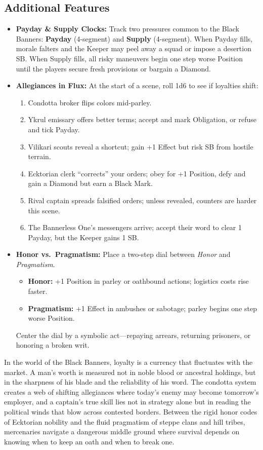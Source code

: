 \subsection*{Additional Features}
\begin{itemize}
\item \textbf{Payday \& Supply Clocks:} Track two pressures common to the Black Banners: \textbf{Payday} (4-segment) and \textbf{Supply} (4-segment). When Payday fills, morale falters and the Keeper may peel away a squad or impose a desertion SB. When Supply fills, all risky maneuvers begin one step worse Position until the players secure fresh provisions or bargain a Diamond.
\item \textbf{Allegiances in Flux:} At the start of a scene, roll 1d6 to see if loyalties shift:
\begin{enumerate}
  \item Condotta broker flips colors mid-parley.  
  \item Ykrul emissary offers better terms; accept and mark Obligation, or refuse and tick Payday.  
  \item Vilikari scouts reveal a shortcut; gain +1 Effect but risk SB from hostile terrain.  
  \item Ecktorian clerk ``corrects'' your orders; obey for +1 Position, defy and gain a Diamond but earn a Black Mark.  
  \item Rival captain spreads falsified orders; unless revealed, counters are harder this scene.  
  \item The Bannerless One's messengers arrive; accept their word to clear 1 Payday, but the Keeper gains 1 SB.  
\end{enumerate}
\item \textbf{Honor vs.\ Pragmatism:} Place a two-step dial between \emph{Honor} and \emph{Pragmatism}.  
\begin{itemize}
  \item \textbf{Honor:} +1 Position in parley or oathbound actions; logistics costs rise faster.  
  \item \textbf{Pragmatism:} +1 Effect in ambushes or sabotage; parley begins one step worse Position.  
\end{itemize}
Center the dial by a symbolic act---repaying arrears, returning prisoners, or honoring a broken writ.
\end{itemize}

\begin{tcolorbox}[colback=black!3,colframe=black!40!white,title={Mercenary Realpolitik}]
In the world of the Black Banners, loyalty is a currency that fluctuates with the market. A man's worth is measured not in noble blood or ancestral holdings, but in the sharpness of his blade and the reliability of his word. The condotta system creates a web of shifting allegiances where today's enemy may become tomorrow's employer, and a captain's true skill lies not in strategy alone but in reading the political winds that blow across contested borders. Between the rigid honor codes of Ecktorian nobility and the fluid pragmatism of steppe clans and hill tribes, mercenaries navigate a dangerous middle ground where survival depends on knowing when to keep an oath and when to break one.
\end{tcolorbox}

